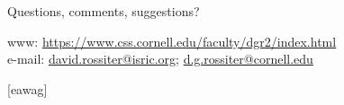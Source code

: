 \documentclass[aspectratio=169, 10pt]{beamer}
\begin{document}


{  %
\begin{frame} 
\frametitle{}
\framesubtitle{}

 \begin{center}
 \vspace{0.5cm}
 \textcolor{isric_yellow}{\Large{Questions, comments, suggestions?}}
 \end{center}
\textcolor{isric_yellow}{www: \url{https://www.css.cornell.edu/faculty/dgr2/index.html}}
\\ 
\textcolor{isric_yellow}{e-mail: \url{david.rossiter@isric.org}; \url{d.g.rossiter@cornell.edu}}
\end{frame} 
}


[eawag] %
\end{document}
